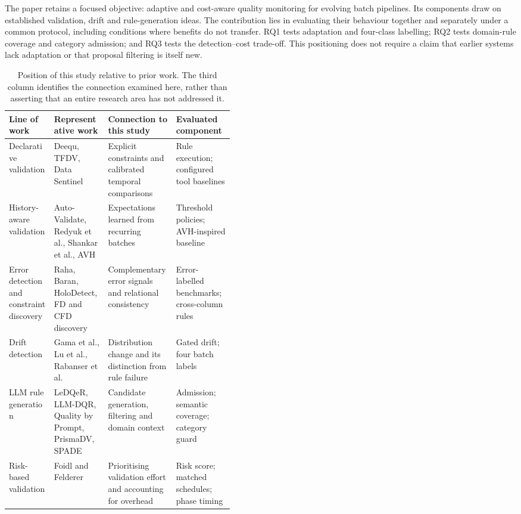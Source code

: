 The paper retains a focused objective: adaptive and cost-aware quality monitoring for evolving batch pipelines. Its components draw on established validation, drift and rule-generation ideas. The contribution lies in evaluating their behaviour together and separately under a common protocol, including conditions where benefits do not transfer. RQ1 tests adaptation and four-class labelling; RQ2 tests domain-rule coverage and category admission; and RQ3 tests the detection--cost trade-off. This positioning does not require a claim that earlier systems lack adaptation or that proposal filtering is itself new.

\begin{table}[t]
\caption{Position of this study relative to prior work. The third column identifies the connection examined here, rather than asserting that an entire research area has not addressed it.}
\label{tab:positioning}
\small
\begin{tabularx}{\linewidth}{@{}p{0.2\linewidth}p{0.24\linewidth}XX@{}}
\toprule
Line of work & Representative work & Connection to this study & Evaluated component \\
\midrule
Declarative validation & Deequ, TFDV, Data Sentinel & Explicit constraints and calibrated temporal comparisons & Rule execution; configured tool baselines \\
History-aware validation & Auto-Validate, Redyuk et al., Shankar et al., AVH & Expectations learned from recurring batches & Threshold policies; AVH-inspired baseline \\
Error detection and constraint discovery & Raha, Baran, HoloDetect, FD and CFD discovery & Complementary error signals and relational consistency & Error-labelled benchmarks; cross-column rules \\
Drift detection & Gama et al., Lu et al., Rabanser et al. & Distribution change and its distinction from rule failure & Gated drift; four batch labels \\
LLM rule generation & LeDQeR, LLM-DQR, Quality by Prompt, PrismaDV, SPADE & Candidate generation, filtering and domain context & Admission; semantic coverage; category guard \\
Risk-based validation & Foidl and Felderer & Prioritising validation effort and accounting for overhead & Risk score; matched schedules; phase timing \\
\bottomrule
\end{tabularx}
\end{table}

